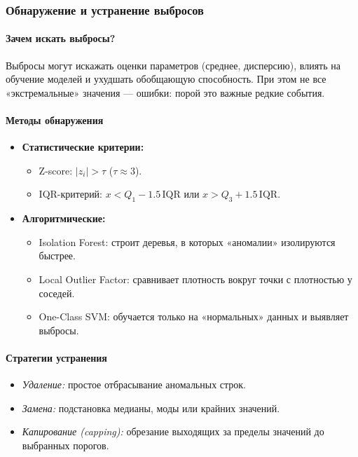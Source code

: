 \subsubsection{Обнаружение и устранение выбросов}
\label{sec:outliers}

\paragraph{Зачем искать выбросы?}  
Выбросы могут искажать оценки параметров (среднее, дисперсию), влиять на обучение моделей и ухудшать обобщающую способность. При этом не все «экстремальные» значения — ошибки: порой это важные редкие события.

\paragraph{Методы обнаружения}
\begin{itemize}
  \item \textbf{Статистические критерии:}
    \begin{itemize}
      \item Z-score: \(\displaystyle |z_i| > \tau\) (\(\tau\approx3\)).
      \item IQR-критерий: \(x < Q_1 - 1.5\,\mathrm{IQR}\) или \(x > Q_3 + 1.5\,\mathrm{IQR}\).
    \end{itemize}
  \item \textbf{Алгоритмические:}
    \begin{itemize}
      \item Isolation Forest: строит деревья, в которых «аномалии» изолируются быстрее.
      \item Local Outlier Factor: сравнивает плотность вокруг точки с плотностью у соседей.
      \item One-Class SVM: обучается только на «нормальных» данных и выявляет выбросы.
    \end{itemize}
\end{itemize}

\paragraph{Стратегии устранения}
\begin{itemize}
  \item \emph{Удаление:} простое отбрасывание аномальных строк.
  \item \emph{Замена:} подстановка медианы, моды или крайних значений.
  \item \emph{Капирование (capping):} обрезание выходящих за пределы значений до выбранных порогов.
\end{itemize}

